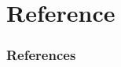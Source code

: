 \documentclass{beamer}
\begin{document}
\section{Reference}
\begin{frame}[t, allowframebreaks]
    \frametitle{References}
    \printbibliography
\end{frame}
\end{document}
